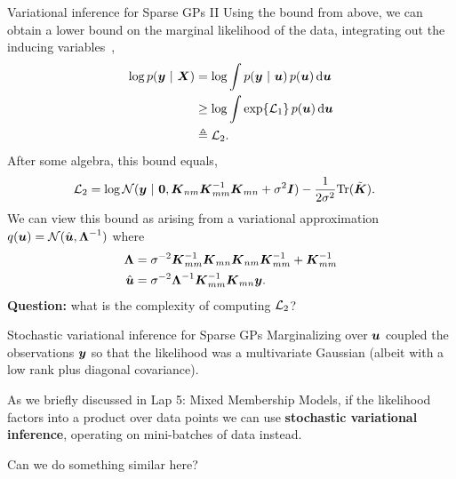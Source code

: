 \documentclass[aspectratio=169]{beamer}
\begin{document}
\begin{frame}{Variational inference for Sparse GPs II}
Using the bound from above, we can obtain a lower bound on the marginal likelihood of the data, integrating out the inducing variables~\citep{Titsias2009-ls},
\begin{align}
    \log p(\boldsymbol{y} ~\vert~ \boldsymbol{X}) &= 
    \log \int p(\boldsymbol{y} ~\vert~ \boldsymbol{u}) \, p(\boldsymbol{u}) \mathop{}\!\mathrm{d} \boldsymbol{u} \\
    &\geq \log \int \exp\{\mathcal{L}_1\} \, p(\boldsymbol{u}) \mathop{}\!\mathrm{d} \boldsymbol{u} \\
    &\triangleq \mathcal{L}_2.
\end{align}
After some algebra, this bound equals,
\begin{align}
    \mathcal{L}_2 &= \log \mathcal{N}(\boldsymbol{y} ~\vert~ \boldsymbol{0}, \boldsymbol{K}_{nm} \boldsymbol{K}_{mm}^{-1} \boldsymbol{K}_{mn} + \sigma^2 \boldsymbol{I}) -\frac{1}{2\sigma^2} \textrm{Tr}(\tilde{\boldsymbol{K}}).
\end{align}
We can view this bound as arising from a variational approximation $q(\boldsymbol{u}) = \mathcal{N}(\hat{\boldsymbol{u}}, \boldsymbol{\Lambda}^{-1})$ where
\begin{align}
    \boldsymbol{\Lambda} &= \sigma^{-2} \boldsymbol{K}_{mm}^{-1} \boldsymbol{K}_{mn} \boldsymbol{K}_{nm} \boldsymbol{K}_{mm}^{-1} + \boldsymbol{K}_{mm}^{-1} \\
    \hat{\boldsymbol{u}} &= \sigma^{-2} \boldsymbol{\Lambda}^{-1} \boldsymbol{K}_{mm}^{-1} \boldsymbol{K}_{mn} \boldsymbol{y}.
\end{align}
\textbf{Question: } what is the complexity of computing $\mathcal{L}_2$?
\end{frame}

\begin{frame}{Stochastic variational inference for Sparse GPs}
    Marginalizing over $\boldsymbol{u}$ coupled the observations $\boldsymbol{y}$ so that the likelihood was a multivariate Gaussian (albeit with a low rank plus diagonal covariance). 
    
    As we briefly discussed in Lap 5: Mixed Membership Models, if the likelihood factors into a product over data points we can use \textbf{stochastic variational inference}, operating on mini-batches of data instead.
    
    Can we do something similar here?
\end{frame}
\end{document}
